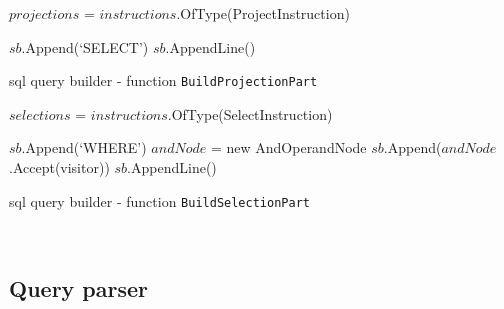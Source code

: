 \begin{algorithm}[!htp]
    \footnotesize
    \DontPrintSemicolon

    

    $projections$ = $instructions$.OfType(ProjectInstruction)\;


    $sb$.Append(`SELECT')\;
    $sb$.AppendLine()\;
    
    \caption{\acrshort{sql}  query builder - function \texttt{BuildProjectionPart}}
    \label{alg:query_builder_buildprojection}
\end{algorithm}

\begin{algorithm}[!htp]
    \footnotesize
    \DontPrintSemicolon

    

    $selections$ = $instructions$.OfType(SelectInstruction)\;


    $sb$.Append(`WHERE')\;
    $andNode$ = new AndOperandNode\;
    $sb$.Append($andNode$.Accept(visitor))\;
    $sb$.AppendLine()\;
    \caption{\acrshort{sql}  query builder - function \texttt{BuildSelectionPart}}
    \label{alg:query_builder_build_selection}
\end{algorithm}

\FloatBarrier\
\subsection{Query parser}



